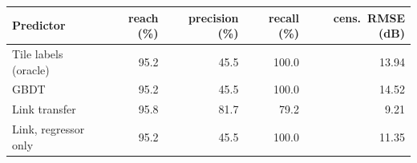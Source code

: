\begin{tabular}{lrrrr}
\toprule
Predictor & reach (\%) & precision (\%) & recall (\%) & cens.\ RMSE (dB) \\
\midrule
Tile labels (oracle) & 95.2 & 45.5 & 100.0 & 13.94 \\
GBDT & 95.2 & 45.5 & 100.0 & 14.52 \\
Link transfer & 95.8 & 81.7 & 79.2 & 9.21 \\
Link, regressor only & 95.2 & 45.5 & 100.0 & 11.35 \\
\bottomrule
\end{tabular}
